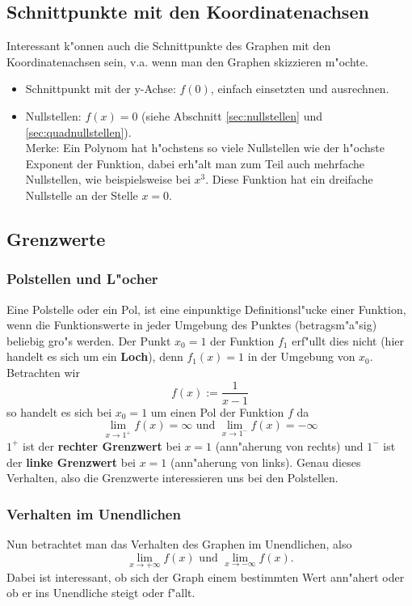 \subsection{Schnittpunkte mit den Koordinatenachsen}
Interessant k"onnen auch die Schnittpunkte des Graphen mit den Koordinatenachsen sein, v.a. wenn man den Graphen skizzieren m"ochte.
\begin{itemize}
\item Schnittpunkt mit der y-Achse: $f(0)$, einfach einsetzten und ausrechnen.
\item Nullstellen: $f(x) = 0$ (siehe Abschnitt \ref{sec:nullstellen} und \ref{sec:quadnullstellen}).\\
Merke: Ein Polynom hat h"ochstens so viele Nullstellen wie der h"ochste Exponent der Funktion, dabei erh"alt man zum Teil auch mehrfache Nullstellen, wie beispielsweise bei $x^3$. Diese Funktion hat ein dreifache Nullstelle an der Stelle $x=0$.
\end{itemize}

\subsection{Grenzwerte} \label{sec:grenzwerte}
\subsubsection{Polstellen und L"ocher}
Eine Polstelle oder ein Pol, ist eine einpunktige Definitionsl"ucke einer Funktion, wenn die Funktionswerte in jeder Umgebung des Punktes (betragsm"a"sig) beliebig gro"s werden. Der Punkt $x_0 = 1$ der Funktion $f_1$ erf"ullt dies nicht (hier handelt es sich um ein \textbf{Loch}), denn $f_1(x) = 1$ in der Umgebung von $x_0$. Betrachten wir 
\begin{equation*}
f(x) := \frac{1}{x-1}
\end{equation*}
so handelt es sich bei $x_0 = 1$ um einen Pol der Funktion $f$ da
\begin{equation*}
\lim\limits_{x \to 1^+} f(x) = \infty \text{ und } \lim\limits_{x \to 1^-} f(x) = -\infty
\end{equation*}
$1^+$ ist der \textbf{rechter Grenzwert} bei $x=1$ (ann"aherung von rechts) und $1^-$ ist der \textbf{linke Grenzwert} bei $x=1$ (ann"aherung von links). Genau dieses Verhalten, also die Grenzwerte interessieren uns bei den Polstellen.

\subsubsection{Verhalten im Unendlichen}
Nun betrachtet man das Verhalten des Graphen im Unendlichen, also
\begin{equation*}
\lim\limits_{x \to +\infty} f(x) \text{ und } \lim\limits_{x \to -\infty} f(x) .
\end{equation*}
 Dabei ist interessant, ob sich der Graph einem bestimmten Wert ann"ahert oder ob er ins Unendliche steigt oder f"allt.

